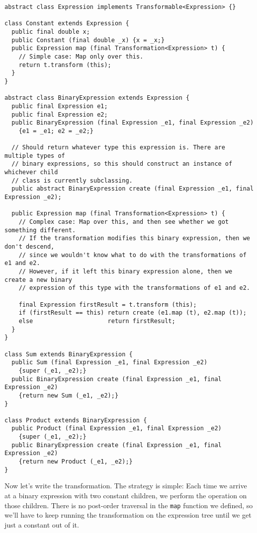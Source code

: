 \documentclass{report}
\begin{document}
\begin{verbatim}
abstract class Expression implements Transformable<Expression> {}

class Constant extends Expression {
  public final double x;
  public Constant (final double _x) {x = _x;}
  public Expression map (final Transformation<Expression> t) {
    // Simple case: Map only over this.
    return t.transform (this);
  }
}

abstract class BinaryExpression extends Expression {
  public final Expression e1;
  public final Expression e2;
  public BinaryExpression (final Expression _e1, final Expression _e2)
    {e1 = _e1; e2 = _e2;}

  // Should return whatever type this expression is. There are multiple types of
  // binary expressions, so this should construct an instance of whichever child
  // class is currently subclassing.
  public abstract BinaryExpression create (final Expression _e1, final Expression _e2);

  public Expression map (final Transformation<Expression> t) {
    // Complex case: Map over this, and then see whether we got something different.
    // If the transformation modifies this binary expression, then we don't descend,
    // since we wouldn't know what to do with the transformations of e1 and e2.
    // However, if it left this binary expression alone, then we create a new binary
    // expression of this type with the transformations of e1 and e2.

    final Expression firstResult = t.transform (this);
    if (firstResult == this) return create (e1.map (t), e2.map (t));
    else                     return firstResult;
  }
}

class Sum extends BinaryExpression {
  public Sum (final Expression _e1, final Expression _e2)
    {super (_e1, _e2);}
  public BinaryExpression create (final Expression _e1, final Expression _e2)
    {return new Sum (_e1, _e2);}
}

class Product extends BinaryExpression {
  public Product (final Expression _e1, final Expression _e2)
    {super (_e1, _e2);}
  public BinaryExpression create (final Expression _e1, final Expression _e2)
    {return new Product (_e1, _e2);}
}
\end{verbatim}

      Now let's write the transformation. The strategy is simple: Each time we arrive at a binary expression with two constant children, we perform the
      operation on those children. There is no post-order traversal in the {\tt map} function we defined, so we'll have to keep running the transformation on
      the expression tree until we get just a constant out of it.
\end{document}

